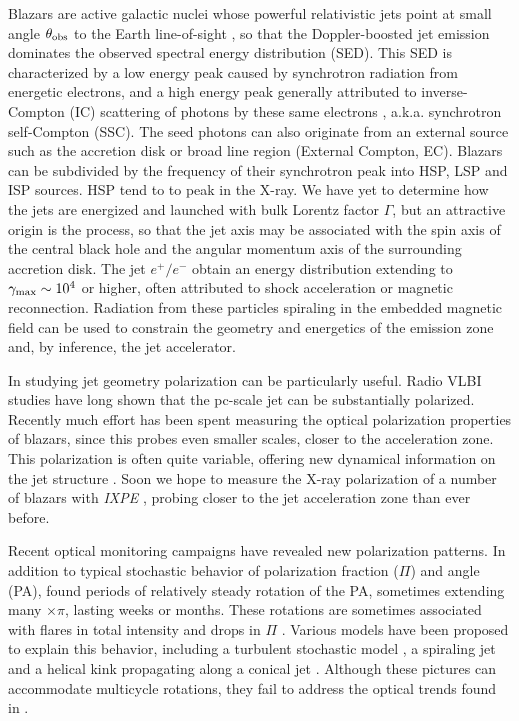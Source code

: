 Blazars are active galactic nuclei whose powerful relativistic jets point at small angle $\theta_{\rm obs}$  to the Earth line-of-sight \citep{urry_unified_1995}, so that the Doppler-boosted jet emission dominates the observed spectral energy distribution (SED). This SED is characterized by a low energy peak caused by synchrotron radiation from energetic electrons, and a high energy peak generally attributed to inverse-Compton (IC) scattering of photons by these same electrons \citep{maraschi_jet_1992}, a.k.a. synchrotron self-Compton (SSC). The seed photons can also originate from an external source such as the accretion disk or broad line region (External Compton, EC). Blazars can be subdivided by the frequency of their synchrotron peak \citep{abdo_spectral_2010} into HSP, LSP and ISP sources. HSP tend to to peak in the X-ray.
We have yet to determine how the jets are energized and launched with bulk Lorentz factor $\Gamma$, but an attractive origin is the \citet{blandford_electromagnetic_1977} process, so that the jet axis may be associated with the spin axis of the central black hole and the angular momentum axis of the surrounding accretion disk. The jet $e^+/e^-$ obtain an energy distribution extending to $\gamma_{\rm max} \sim 10^4$ or higher, often attributed to shock acceleration or magnetic reconnection. Radiation from these particles spiraling in the embedded magnetic field can be used to constrain the geometry and energetics of the emission zone and, by inference, the jet accelerator.

In studying jet geometry polarization can be particularly useful. Radio VLBI studies have long shown that the pc-scale jet can be substantially polarized. Recently much effort has been spent measuring the optical polarization properties of blazars, since this probes even smaller scales, closer to the acceleration zone. This polarization is often quite variable, offering new dynamical information on the jet structure \citep[e.g.][]{blinov_robopol_2015, lynch_green_2018}.
Soon we hope to measure the X-ray polarization of a number of blazars with \textit{IXPE} \citep{weisskopf_imaging_2016}, probing closer to the jet acceleration zone than ever before.

Recent optical monitoring campaigns have revealed new polarization patterns. In addition to typical stochastic behavior of polarization fraction ($\Pi$) and angle (PA), \citet{blinov_robopol_2015} found periods of relatively steady rotation of the PA, sometimes extending many $\times \pi$, lasting weeks or months. These rotations are sometimes associated with flares in total intensity and drops in $\Pi$ \citep{blinov_robopol_2016}. Various models have been proposed to explain this behavior, including a turbulent stochastic model \citep{marscher_turbulent_2014}, a spiraling jet \citep{lyutikov_polarization_2017} and a helical kink propagating along a conical jet \citep{nalewajko_model_2017}. Although these pictures can accommodate multicycle rotations, they fail to address the optical trends found in \citet{blinov_robopol_2016}.

